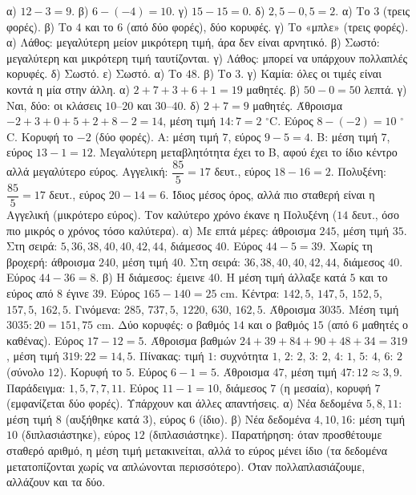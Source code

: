  α) $12-3=9$. β) $6-(-4)=10$. γ) $15-15=0$. δ) $2{,}5-0{,}5=2$.
 α) Το $3$ (τρεις φορές). β) Το $4$ και το $6$ (από δύο φορές), δύο κορυφές. γ) Το «μπλε» (τρεις φορές).
 α) Λάθος: μεγαλύτερη μείον μικρότερη τιμή, άρα δεν είναι αρνητικό. β) Σωστό: μεγαλύτερη και μικρότερη τιμή ταυτίζονται. γ) Λάθος: μπορεί να υπάρχουν πολλαπλές κορυφές. δ) Σωστό. ε) Σωστό.
 α) Το $48$. β) Το $3$. γ) Καμία: όλες οι τιμές είναι κοντά η μία στην άλλη.
 α) $2+7+3+6+1=19$ μαθητές. β) $50-0=50$ λεπτά. γ) Ναι, δύο: οι κλάσεις $10$--$20$ και $30$--$40$. δ) $2+7=9$ μαθητές.
 Άθροισμα $-2+3+0+5+2+8-2=14$, μέση τιμή $14:7=2$ $^\circ$C. Εύρος $8-(-2)=10$ $^\circ$C. Κορυφή το $-2$ (δύο φορές).
 Α: μέση τιμή $7$, εύρος $9-5=4$. Β: μέση τιμή $7$, εύρος $13-1=12$. Μεγαλύτερη μεταβλητότητα έχει το Β, αφού έχει το ίδιο κέντρο αλλά μεγαλύτερο εύρος.
 Αγγελική: $\dfrac{85}{5}=17$ δευτ., εύρος $18-16=2$. Πολυξένη: $\dfrac{85}{5}=17$ δευτ., εύρος $20-14=6$. Ίδιος μέσος όρος, αλλά πιο σταθερή είναι η Αγγελική (μικρότερο εύρος). Τον καλύτερο χρόνο έκανε η Πολυξένη ($14$ δευτ., όσο πιο μικρός ο χρόνος τόσο καλύτερα).
 α) Με επτά μέρες: άθροισμα $245$, μέση τιμή $35$. Στη σειρά: $5,36,38,40,40,42,44$, διάμεσος $40$. Εύρος $44-5=39$. Χωρίς τη βροχερή: άθροισμα $240$, μέση τιμή $40$. Στη σειρά: $36,38,40,40,42,44$, διάμεσος $40$. Εύρος $44-36=8$. β) Η διάμεσος: έμεινε $40$. Η μέση τιμή άλλαξε κατά $5$ και το εύρος από $8$ έγινε $39$.
 Εύρος $165-140=25$ cm. Κέντρα: $142{,}5$, $147{,}5$, $152{,}5$, $157{,}5$, $162{,}5$. Γινόμενα: $285$, $737{,}5$, $1220$, $630$, $162{,}5$. Άθροισμα $3035$. Μέση τιμή $3035:20=151{,}75$ cm.
 Δύο κορυφές: ο βαθμός $14$ και ο βαθμός $15$ (από $6$ μαθητές ο καθένας). Εύρος $17-12=5$. Άθροισμα βαθμών $24+39+84+90+48+34=319$, μέση τιμή $319:22=14{,}5$.
 Πίνακας: τιμή $1$: συχνότητα $1$, $2$: $2$, $3$: $2$, $4$: $1$, $5$: $4$, $6$: $2$ (σύνολο $12$). Κορυφή το $5$. Εύρος $6-1=5$. Άθροισμα $47$, μέση τιμή $47:12\approx3{,}9$.
 Παράδειγμα: $1,5,7,7,11$. Εύρος $11-1=10$, διάμεσος $7$ (η μεσαία), κορυφή $7$ (εμφανίζεται δύο φορές). Υπάρχουν και άλλες απαντήσεις.
 α) Νέα δεδομένα $5, 8, 11$: μέση τιμή $8$ (αυξήθηκε κατά $3$), εύρος $6$ (ίδιο). β) Νέα δεδομένα $4, 10, 16$: μέση τιμή $10$ (διπλασιάστηκε), εύρος $12$ (διπλασιάστηκε). Παρατήρηση: όταν προσθέτουμε σταθερό αριθμό, η μέση τιμή μετακινείται, αλλά το εύρος μένει ίδιο (τα δεδομένα μετατοπίζονται χωρίς να απλώνονται περισσότερο). Όταν πολλαπλασιάζουμε, αλλάζουν και τα δύο.
